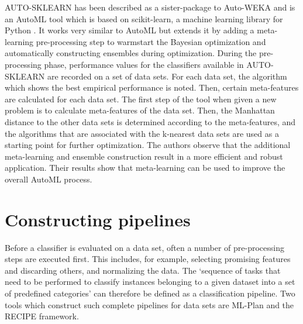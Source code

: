 AUTO-SKLEARN has been described as a sister-package to Auto-WEKA and is an AutoML tool which is based on scikit-learn, a machine learning library for Python \cite{feurer2015efficient}. It works very similar to AutoML but extends it by adding a meta-learning pre-processing step to warmstart the Bayesian optimization and automatically constructing ensembles during optimization. During the pre-processing phase, performance values for the classifiers available in AUTO-SKLEARN are recorded on a set of data sets. For each data set, the algorithm which shows the best empirical performance is noted. Then, certain meta-features are calculated for each data set. The first step of the tool when given a new problem is to calculate meta-features of the data set. Then, the Manhattan distance to the other data sets is determined according to the meta-features, and the algorithms that are associated with the k-nearest data sets are used as a starting point for further optimization. The authors observe that the additional meta-learning and ensemble construction result in a more efficient and robust application. Their results show that meta-learning can be used to improve the overall AutoML process.\\

\section{Constructing pipelines}
\label{sec:related:pipelines}
Before a classifier is evaluated on a data set, often a number of pre-processing steps are executed first. This includes, for example, selecting promising features and discarding others, and normalizing the data. The `sequence of tasks that need to be performed to classify instances belonging to a given dataset into a set of predefined categories' \cite{DBLP:conf/eurogp/SaPOP17} can therefore be defined as a classification pipeline. Two tools which construct such complete pipelines for data sets are ML-Plan and the RECIPE framework.

